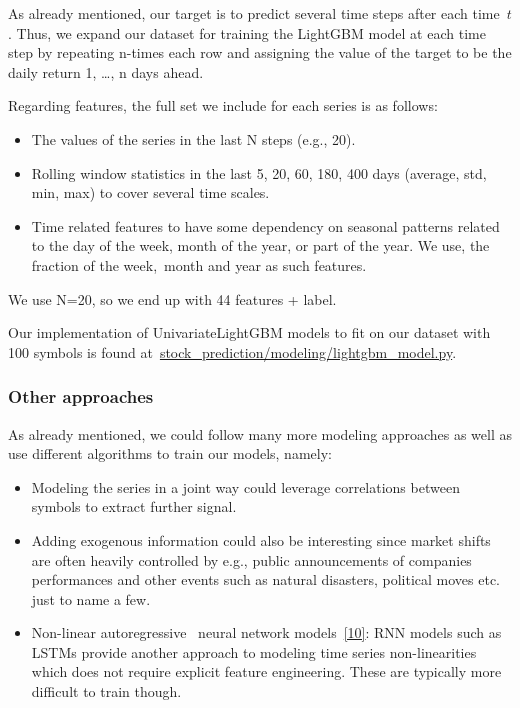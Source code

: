 \documentclass[10pt]{article}
\providecommand{\tightlist}{\setlength{\itemsep}{0pt}\setlength{\parskip}{0pt}}%
\begin{document}
As already mentioned, our target is to predict several time steps after
each time~\(t\). Thus, we expand our dataset for training
the LightGBM model at each time step by repeating n-times each row and
assigning the value of the target to be the daily return 1, \ldots{}, n
days ahead.~

Regarding features, the full set we include for each series is as
follows:

\begin{itemize}
\tightlist
\item
  The values of the series in the last N steps (e.g., 20).
\item
  Rolling window statistics in the last 5, 20, 60, 180, 400 days
  (average, std, min, max) to cover several time scales.
\item
  Time related features to have some dependency on seasonal patterns
  related to the day of the week, month of the year, or part of the
  year. We use, the fraction of the week,~month and year as such
  features.~
\end{itemize}

We use N=20, so we end up with 44 features + label.

Our implementation of UnivariateLightGBM models to fit on our dataset
with 100 symbols is found
at~\href{https://github.com/marcoopsampaio/aws_ml_eng_project_stock_prediction/blob/main/stock_prediction/modeling/lightgbm_model.py}{stock\_prediction/modeling/lightgbm\_model.py}.

\subsubsection{Other approaches}

{\label{633940}}

As already mentioned, we could follow many more modeling approaches as
well as use different algorithms to train our models, namely:

\begin{itemize}
\tightlist
\item
  Modeling the series in a joint way could leverage correlations between
  symbols to extract further signal.
\item
  Adding exogenous information could also be interesting since market
  shifts are often heavily controlled by e.g., public announcements of
  companies performances and other events such as natural disasters,
  political moves etc. just to name a few.
\item
  Non-linear autoregressive~ neural network models~\hyperref[csl:10]{[10]}:
  RNN models such as LSTMs provide another approach to modeling time
  series non-linearities which does not require explicit feature
  engineering. These are typically more difficult to train though.
\end{itemize}
\end{document}
